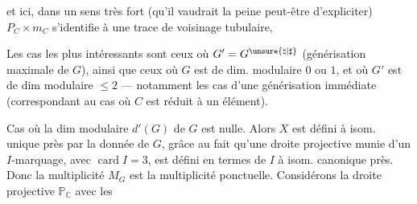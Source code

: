 et ici, dans un sens très fort (qu'il vaudrait la peine peut-être d'expliciter) $P_C\times m_C$ s'identifie à une trace de voisinage tubulaire, 

Les cas les plus intéressants sont ceux où $G'=G^{\unsure{\natural|\sharp}}$ (générisation maximale de $G$), ainsi que ceux où $G$ est de dim. modulaire $0$ ou $1$,  et où $G'$ est de dim modulaire $\leq2$ --- notamment les cas d'une générisation immédiate (correspondant au cas où $C$ est réduit à un élément).

Cas où la dim modulaire $d'(G)$ de $G$ est nulle.
Alors $X$ est défini à isom. unique près par la donnée de $G$, grâce au fait qu'une droite projective munie d'un  $I$-marquage, avec $\operatorname{card}I=3$, est défini en termes de $I$ à isom. canonique près. Donc la multiplicité $M_G$ est la multiplicité ponctuelle. Considérons  la droite projective $\mathbb P_{\mathbb C}$ avec les
